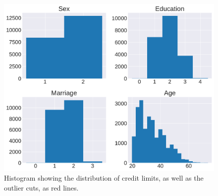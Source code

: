 \documentclass[10pt, twocolumn]{article}
\begin{document}
\begin{appendices}
\begin{figure}[h]
    \centering
    \includegraphics[scale=0.4]{../figs/CC_params_hist.pdf}
    \caption{Histogram showing the distribution of credit limits, as well as the outlier cuts, as red lines.}
    \label{fig:app3}
\end{figure}


\end{appendices}
\end{document}
